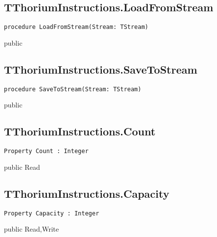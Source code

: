 \subsection{TThoriumInstructions.LoadFromStream}
\label{thoriumcorepkg:thorium:tthoriuminstructions:loadfromstream}
\begin{FPCList}
\Declaration 

\begin{verbatim}
procedure LoadFromStream(Stream: TStream)
\end{verbatim}
\Visibility
public
\end{FPCList}
\subsection{TThoriumInstructions.SaveToStream}
\label{thoriumcorepkg:thorium:tthoriuminstructions:savetostream}
\begin{FPCList}
\Declaration 

\begin{verbatim}
procedure SaveToStream(Stream: TStream)
\end{verbatim}
\Visibility
public
\end{FPCList}
\subsection{TThoriumInstructions.Count}
\label{thoriumcorepkg:thorium:tthoriuminstructions:count}
\begin{FPCList}
\Declaration 

\begin{verbatim}
Property Count : Integer
\end{verbatim}
\Visibility
public
\Access
Read
\end{FPCList}
\subsection{TThoriumInstructions.Capacity}
\label{thoriumcorepkg:thorium:tthoriuminstructions:capacity}
\begin{FPCList}
\Declaration 

\begin{verbatim}
Property Capacity : Integer
\end{verbatim}
\Visibility
public
\Access
Read,Write
\end{FPCList}
